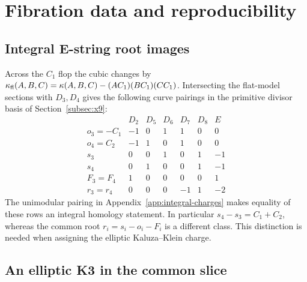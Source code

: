 \section{Fibration data and reproducibility}
\label{app:reproducibility}

\subsection{Integral E-string root images}

Across the $C_1$ flop the cubic changes by
$\kappa_{\rm fl}(A,B,C)=\kappa(A,B,C)-(AC_1)(BC_1)(CC_1)$.
Intersecting the flat-model sections with $D_3,D_4$ gives the
following curve pairings in the primitive divisor basis of
Section~\ref{subsec:x9}:
\begin{equation}
\begin{array}{c|rrrrrr}
 &D_2&D_5&D_6&D_7&D_8&E\\\hline
 o_3=-C_1&-1&0&1&1&0&0\\
 o_4=C_2&-1&1&0&1&0&0\\
 s_3&0&0&1&0&1&-1\\
 s_4&0&1&0&0&1&-1\\
 F_3=F_4&1&0&0&0&0&1\\
 r_3=r_4&0&0&0&-1&1&-2
\end{array}
\label{eq:x9-estring-pairing-table}
\end{equation}
The unimodular pairing in Appendix~\ref{app:integral-charges}
makes equality of these rows an integral homology statement.
In particular $s_4-s_3=C_1+C_2$, whereas the common root
$r_i=s_i-o_i-F_i$ is a different class. This distinction is
needed when assigning the elliptic Kaluza--Klein charge.

\subsection{An elliptic K3 in the common slice}

